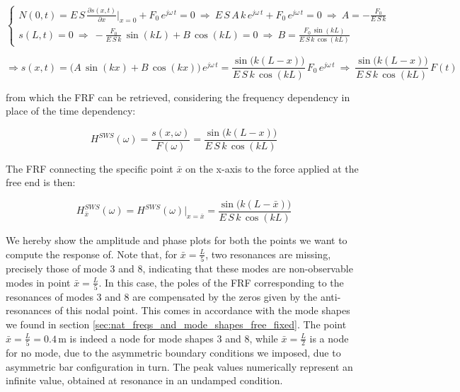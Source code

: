 \documentclass[a4paper,12pt,oneside]{article}
\begin{document}
\[ \begin{cases}
	N(0,t) = E \, S \, \frac{\partial s(x,t)}{\partial x} \Big|_{x=0} + %
		F_0 \, e^{j \omega \, t} = 0 %
		~ \Rightarrow ~ E \, S \, A \, k \, e^{j \omega \, t} + %
		F_0 \, e^{j \omega \, t} = 0 %
		~ \Rightarrow ~ A = -\frac{F_0}{E \, S \, k} \\
	s(L,t) = 0 ~ \Rightarrow ~ -\frac{F_0}{E \, S \, k} \, \sin(kL) + B \, \cos(kL) = 0 %
		~ \Rightarrow ~ B = \frac{F_0 \, \sin(kL)}{E \, S \, k \, \cos(kL)}
\end{cases} \]

\[
	\Rightarrow s(x,t) = \bigl(A \, \sin(kx) + B \, \cos(kx)\bigl) \, e^{j \omega \, t} =
		\frac{\sin\bigl(k(L - x)\bigr)}{E \, S \, k \, \cos(kL)} \,
		F_0 \, e^{j \omega \, t}
		~ \Rightarrow ~ \frac{\sin\bigl(k(L - x)\bigr)}{E \, S \, k \, \cos(kL)} \, F(t)
\]

from which the FRF can be retrieved, considering the frequency dependency in place of the time dependency:

\[
	H^{SWS}(\omega) = \frac{s(x, \omega)}{F(\omega)} = %
		\frac{\sin\bigl(k(L - x)\bigr)}{E \, S \, k \, \cos(kL)}
\]

\vspace{20pt}

The FRF connecting the specific point $ \bar{x} $ on the x-axis to the force applied at the free end is then:

\begin{equation}
\label{eqn:frf_sws}
	H^{SWS}_{\bar{x}}(\omega) = H^{SWS}(\omega)\big|_{x = \bar{x}} = %
		\frac{\sin\bigl(k(L - \bar{x})\bigr)}{E \, S \, k \, \cos(kL)}
\end{equation}

\vspace{20pt}

We hereby show the amplitude and phase plots for both the points we want to compute the response of. Note that, for $ \bar{x} = \frac{L}{5} $, two resonances are missing, precisely those of mode 3 and 8, indicating that these modes are non-observable modes in point $ \bar{x} = \frac{L}{5} $. In this case, the poles of the FRF corresponding to the resonances of modes 3 and 8 are compensated by the zeros given by the anti-resonances of this nodal point. This comes in accordance with the mode shapes we found in section \ref{sec:nat_freqs_and_mode_shapes_free_fixed}. The point $ \bar{x} = \frac{L}{5} = 0.4 \, \text{m} $ is indeed a node for mode shapes 3 and 8, while $ \bar{x} = \frac{L}{2} $ is a node for no mode, due to the asymmetric boundary conditions we imposed, due to asymmetric bar configuration in turn. The peak values numerically represent an infinite value, obtained at resonance in an undamped condition.
\end{document}
